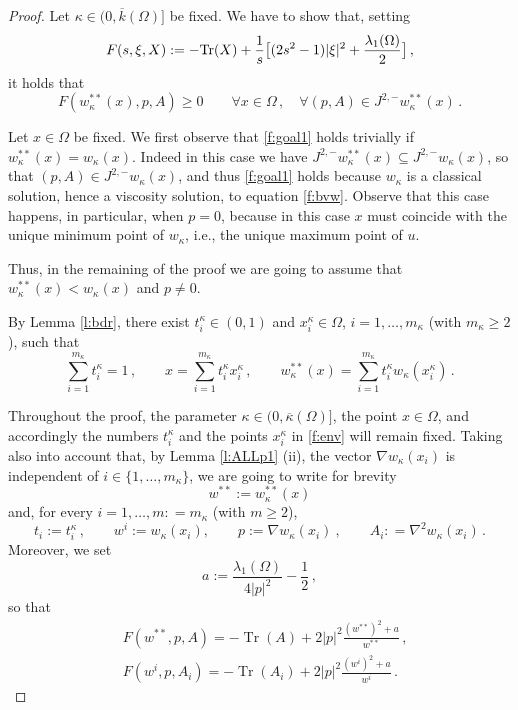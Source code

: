 \documentclass[11pt]{amsart}
\theoremstyle{definition}
\theoremstyle{remark}
\def\Om{\Omega}
\def\k{\kappa}
\def\subjet{J^{2,-}}
\DeclareMathOperator{\Tr}{Tr}
\begin{document}
\begin{proof}
Let $\k \in (0, \overline k (\Om)]$ be fixed. We have to show that, setting  
$$F (s , \xi, X):= - {\rm {\rm Tr} } ( X)  + \frac{1}{s} \big [ ( 2 s ^ 2 -1 ) |\xi| ^ 2 +\frac{\lambda _ 1 (\Om) }{2} \big ] \,,$$ 
it holds that
\begin{equation}\label{f:goal1}
F ( w _\k ^{**}(x), p, A ) \geq 0 \qquad \forall x \in \Om \,, \quad \forall (p, A) \in \subjet w _\k  ^ { ** } ( x) \,.
\end{equation} 


Let $x \in \Om$ be fixed. 
We first observe that \eqref{f:goal1} holds trivially  if $w _\k ^{**}(x) = w _\k ( x)$. Indeed in this case we have  
$ \subjet w _\k  ^ { ** } ( x) \subseteq \subjet w _\k   ( x)$, so that 
$(p, A) \in \subjet w _\k   ( x)$, and thus \eqref{f:goal1} holds because $w _\k$ is a classical solution, hence a viscosity solution,  to equation \eqref{f:bvw}. 
Observe that this case happens, in particular, when $p=0$, because in this case $x$ must coincide with the unique minimum point of $w_\k$,
i.e., the unique maximum point of $u$.

Thus, in the remaining of the proof we are going to assume that $w _\k ^{**}(x) < w _\k ( x)$ and $p\neq 0$. 



By Lemma \ref{l:bdr}, there exist $t ^\k  _i \in (0, 1)$ and  $x ^\k _i \in \Om$, $i = 1, \dots, m_\k$ (with $m _\k \geq 2$), 
such that
\begin{equation}\label{f:env}
\sum _{i=1}^{m _\k} t ^\k  _i =1\,, \qquad
x = \sum _{i=1}
 ^{m _\k} t ^\k  _i x ^\k  _i\,, \qquad w^{**} _\k  (x)  = \sum _ { i = 1} ^{ m_\k} t ^\k   _i w _\k  ( x ^\k _i) \,.
\end{equation} 
 
Throughout the proof, the parameter
$\k \in (0, \overline \k (\Om)]$, the point $x \in \Om$, and accordingly the
numbers $t^\k _i $ and  the points $x^\k _i $ in \eqref{f:env}  will remain fixed. 
Taking also into account that,  by Lemma \ref{l:ALLp1} (ii), the vector  $\nabla  w  _\k ( x_i)$  is  independent of  $i \in \{ 1, \dots, m _\k\}$,
we are going to write for brevity  
$$w ^{**} := w^{**} _\k  (x)$$
and, for every $i = 1, \dots, m: = m _\k$ (with $m \geq 2$), 
$$t_i:= t ^ \k _ i \, , \qquad w^i:= w  _\k ( x_i),    \qquad p:= \nabla  w  _\k ( x_i)\ , \qquad A _{ i}: = \nabla ^ 2 w _\k  ( x_i) \,.$$ 
Moreover, we set 
 \begin{equation}\label{f:defa} 
 a:=  \frac{\lambda _1 (\Om)}{4| p | ^ 2 } - \frac 1 2 \,,
 \end{equation}
so that
$$\begin{aligned}
& F (w^{**}, p, A )  = - \Tr (A)+  2 |p| ^ 2 \frac{(w^{**} ) ^ 2 + a}{w ^ {**}}\,,
\\ 
& F (w^i, p, A_i )  =- \Tr (A_i) + 2 |p| ^ 2 \frac{(w^{i} ) ^ 2 + a}{w ^ {i}} \,.  
 \end{aligned}$$
  

\end{proof}
\end{document}
